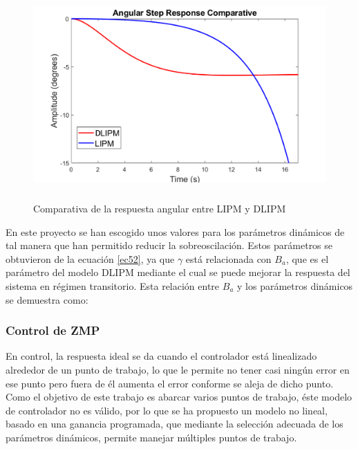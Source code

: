 \begin{itemize}
\begin{figure}[H]
\centering
\includegraphics[width=13cm, height=8cm]{imagenes/apartado_5/59_comparativa_paso}
\caption{Comparativa de la respuesta angular entre LIPM y DLIPM}
\label{figura58}
\end{figure}

En este proyecto se han escogido unos valores para los parámetros dinámicos de tal manera que han permitido reducir la sobreoscilación. Estos parámetros se obtuvieron de la ecuación \ref{ec52}, ya que $\gamma$ está relacionada con $B_a$, que es el parámetro del modelo DLIPM mediante el cual se puede mejorar la respuesta del sistema en régimen transitorio. Esta relación entre $B_a$ y los parámetros dinámicos se demuestra como:



\end{itemize}



\subsubsection{Control de ZMP}

En control, la respuesta ideal se da cuando el controlador está linealizado alrededor de un punto de trabajo, lo que le permite no tener casi ningún error en ese punto pero fuera de él aumenta el error conforme se aleja de dicho punto. Como el objetivo de este trabajo es abarcar varios puntos de trabajo, éste modelo de controlador no es válido, por lo que se ha propuesto un modelo no lineal, basado en una ganancia programada, que mediante la selección adecuada de los parámetros dinámicos, permite manejar múltiples puntos de trabajo. 

